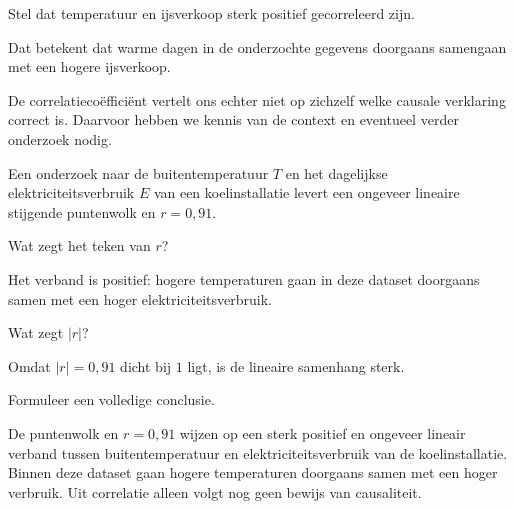 \documentclass{ximera}
\begin{document}
\begin{voorbeeld}
Stel dat temperatuur en ijsverkoop sterk positief gecorreleerd zijn.

Dat betekent dat warme dagen in de onderzochte gegevens doorgaans
samengaan met een hogere ijsverkoop.

De correlatiecoëfficiënt vertelt ons echter niet op zichzelf welke
causale verklaring correct is. Daarvoor hebben we kennis van de context
en eventueel verder onderzoek nodig.
\end{voorbeeld}



\begin{oefening}{\oefU \ESS}

Een onderzoek naar de buitentemperatuur $T$ en het dagelijkse
elektriciteitsverbruik $E$ van een koelinstallatie levert een
ongeveer lineaire stijgende puntenwolk en
\(
r=0{,}91.
\)

\begin{question}
Wat zegt het teken van $r$?

\begin{oplossing}
Het verband is positief: hogere temperaturen gaan in deze dataset
doorgaans samen met een hoger elektriciteitsverbruik.
\end{oplossing}
\end{question}

\begin{question}
Wat zegt $|r|$?

\begin{oplossing}
Omdat $|r|=0{,}91$ dicht bij $1$ ligt, is de lineaire samenhang sterk.
\end{oplossing}
\end{question}

\begin{question}
Formuleer een volledige conclusie.

\begin{oplossing}
De puntenwolk en $r=0{,}91$ wijzen op een sterk positief en ongeveer
lineair verband tussen buitentemperatuur en elektriciteitsverbruik van
de koelinstallatie. Binnen deze dataset gaan hogere temperaturen
doorgaans samen met een hoger verbruik. Uit correlatie alleen volgt
nog geen bewijs van causaliteit.
\end{oplossing}
\end{question}
\end{oefening}
\end{document}
